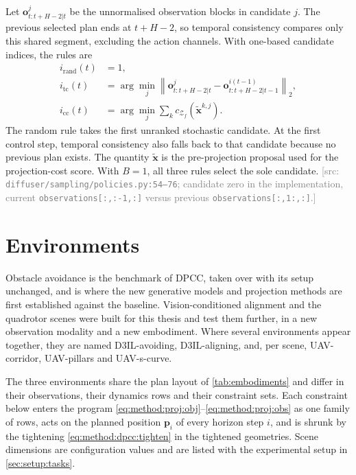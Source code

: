 \documentclass[headsepline,footsepline,footinclude=false,oneside,fontsize=11pt,paper=a4,listof=totoc,bibliography=totoc]{scrbook}
\theoremstyle{definition}
\theoremstyle{plain}
\theoremstyle{remark}
\newcommand{\vect}[1]{\boldsymbol{#1}}
\newcommand{\sidx}[1]{_{\textrm{#1}}}
\newif\ifsubmission
\newcommand{\srcnote}[1]{\ifsubmission\else\textcolor{gray}{\footnotesize\textsf{[src: #1]}}\fi}
\begin{document}
Let $\vect{o}^{j}_{t:t+H-2|t}$ be the unnormalised observation blocks in candidate $j$.
The previous selected plan ends at $t+H-2$, so temporal consistency compares only this shared
segment, excluding the action channels. With one-based candidate indices, the rules are
\begin{equation}\label{eq:method:sel:rules}
\begin{aligned}
  i\sidx{rand}(t)&=1,\\
  i\sidx{tc}(t)&=\arg\min_j\left\|\vect{o}^{j}_{t:t+H-2|t}
                -\vect{o}^{i(t-1)}_{t:t+H-2|t-1}\right\|_2,\\
  i\sidx{cc}(t)&=\arg\min_j\sum_k c_{\mathcal{Z}_f}(\tilde{\vect{x}}^{k,j}).
\end{aligned}
\end{equation}
The random rule takes the first unranked stochastic candidate. At the first control step, temporal
consistency also falls back to that candidate because no previous plan exists. The quantity
$\tilde{\vect{x}}$ is the pre-projection proposal used for the projection-cost score. With $B=1$,
all three rules select the sole candidate.
\srcnote{\texttt{diffuser/sampling/policies.py:54--76}; candidate zero in the implementation,
current \texttt{observations[:,:-1,:]} versus previous \texttt{observations[:,1:,:]}.}

\section{Environments}\label{sec:method:envs}

Obstacle avoidance is the
benchmark of \ac{DPCC}, taken over with its setup unchanged, and is where the new generative models
and projection methods are first established against the baseline. Vision-conditioned alignment and the
quadrotor scenes were built for this thesis and test them further, in a new observation modality and a
new embodiment. Where several environments appear together, they are named D3IL-avoiding,
D3IL-aligning, and, per scene, UAV-corridor, UAV-pillars and UAV-s-curve.

The three environments share the plan layout of \autoref{tab:embodiments} and differ in their
observations, their dynamics rows and their constraint sets. Each constraint below enters the program
\eqref{eq:method:proj:obj}--\eqref{eq:method:proj:obs} as one family of rows, acts on the planned
position $\vect{p}_{i}$ of every horizon step $i$, and is shrunk by the tightening
\eqref{eq:method:dpcc:tighten} in the tightened geometries. Scene dimensions are configuration values and
are listed with the experimental setup in \autoref{sec:setup:tasks}.
\end{document}
